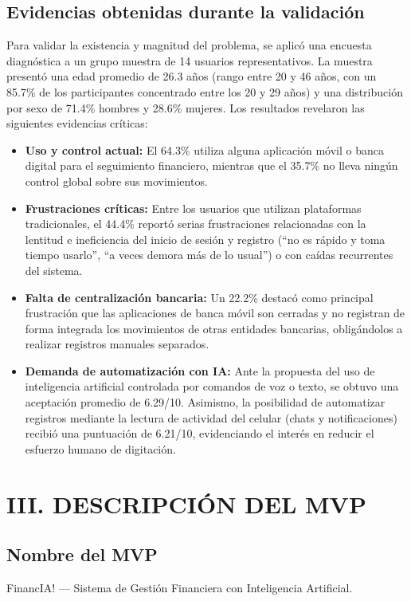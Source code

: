\documentclass[12pt]{article}
\begin{document}
\subsection{Evidencias obtenidas durante la validación}
Para validar la existencia y magnitud del problema, se aplicó una encuesta diagnóstica a un grupo muestra de 14 usuarios representativos. La muestra presentó una edad promedio de 26.3 años (rango entre 20 y 46 años, con un 85.7\% de los participantes concentrado entre los 20 y 29 años) y una distribución por sexo de 71.4\% hombres y 28.6\% mujeres. Los resultados revelaron las siguientes evidencias críticas:
\begin{itemize}
    \item \textbf{Uso y control actual:} El 64.3\% utiliza alguna aplicación móvil o banca digital para el seguimiento financiero, mientras que el 35.7\% no lleva ningún control global sobre sus movimientos.
    \item \textbf{Frustraciones críticas:} Entre los usuarios que utilizan plataformas tradicionales, el 44.4\% reportó serias frustraciones relacionadas con la lentitud e ineficiencia del inicio de sesión y registro (``no es rápido y toma tiempo usarlo'', ``a veces demora más de lo usual'') o con caídas recurrentes del sistema.
    \item \textbf{Falta de centralización bancaria:} Un 22.2\% destacó como principal frustración que las aplicaciones de banca móvil son cerradas y no registran de forma integrada los movimientos de otras entidades bancarias, obligándolos a realizar registros manuales separados.
    \item \textbf{Demanda de automatización con IA:} Ante la propuesta del uso de inteligencia artificial controlada por comandos de voz o texto, se obtuvo una aceptación promedio de 6.29/10. Asimismo, la posibilidad de automatizar registros mediante la lectura de actividad del celular (chats y notificaciones) recibió una puntuación de 6.21/10, evidenciando el interés en reducir el esfuerzo humano de digitación.
\end{itemize}

\newpage

\section{III. DESCRIPCIÓN DEL MVP}

\subsection{Nombre del MVP}
FinancIA! — Sistema de Gestión Financiera con Inteligencia Artificial.
\end{document}
